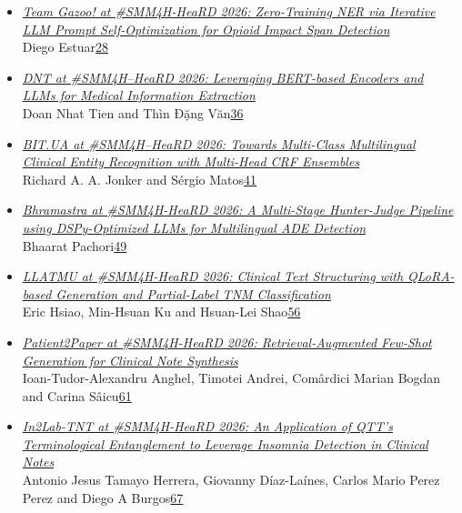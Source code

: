 \documentclass[11pt,oneside]{book}
\begin{document}
\begin{itemize}[leftmargin=*,label={}]
       \item \hyperlink{page.28}{\emph{Team Gazoo! at \#SMM4H-HeaRD 2026: Zero-Training NER via Iterative LLM Prompt Self-Optimization for Opioid Impact Span Detection}}\\ \hspace*{2em} Diego Estuar\dotfill \hyperlink{page.28}{28}
       \item \hyperlink{page.36}{\emph{DNT at \#SMM4H–HeaRD 2026: Leveraging BERT-based Encoders and LLMs for Medical Information Extraction}}\\ \hspace*{2em} Doan Nhat Tien and Thìn Đặng Văn\dotfill \hyperlink{page.36}{36}
       \item \hyperlink{page.41}{\emph{BIT.UA at \#SMM4H–HeaRD 2026: Towards Multi-Class Multilingual Clinical Entity Recognition with Multi-Head CRF Ensembles}}\\ \hspace*{2em} Richard A. A. Jonker and Sérgio Matos\dotfill \hyperlink{page.41}{41}
       \item \hyperlink{page.49}{\emph{Bhramastra at \#SMM4H-HeaRD 2026: A Multi-Stage Hunter-Judge Pipeline using DSPy-Optimized LLMs for Multilingual ADE Detection}}\\ \hspace*{2em} Bhaarat Pachori\dotfill \hyperlink{page.49}{49}
       \item \hyperlink{page.56}{\emph{LLATMU at \#SMM4H-HeaRD 2026: Clinical Text Structuring with QLoRA-based Generation and Partial-Label TNM Classification}}\\ \hspace*{2em} Eric Hsiao, Min-Hsuan Ku and Hsuan-Lei Shao\dotfill \hyperlink{page.56}{56}
       \item \hyperlink{page.61}{\emph{Patient2Paper at \#SMM4H-HeaRD 2026: Retrieval-Augmented Few-Shot Generation for Clinical Note Synthesis}}\\ \hspace*{2em} Ioan-Tudor-Alexandru Anghel, Timotei Andrei, Comârdici Marian Bogdan and Carina Sâicu\dotfill \hyperlink{page.61}{61}
       \item \hyperlink{page.67}{\emph{In2Lab-TNT at \#SMM4H-HeaRD 2026: An Application of QTT's Terminological Entanglement to Leverage Insomnia Detection in Clinical Notes}}\\ \hspace*{2em} Antonio Jesus Tamayo Herrera, Giovanny Díaz-Laínes, Carlos Mario Perez Perez and Diego A Burgos\dotfill \hyperlink{page.67}{67}

\end{itemize}
\end{document}
